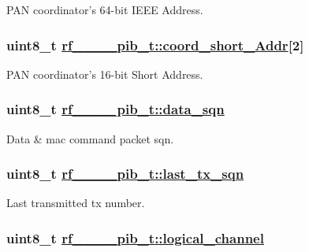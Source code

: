 PAN coordinator's 64-bit IEEE Address. \hypertarget{structrf__802__15__4__pib__t_0bf213a8ed84006ff69a764f07d09b85}{
\subsubsection[coord\_\-short\_\-Addr]{\setlength{\rightskip}{0pt plus 5cm}uint8\_\-t \hyperlink{structrf__802__15__4__pib__t_0bf213a8ed84006ff69a764f07d09b85}{rf\_\_\_\_\-pib\_\-t::coord\_\-short\_\-Addr}\mbox{[}2\mbox{]}}}
\label{structrf__802__15__4__pib__t_0bf213a8ed84006ff69a764f07d09b85}


PAN coordinator's 16-bit Short Address. \hypertarget{structrf__802__15__4__pib__t_48f4794258b60399b861fb91fe95dbb0}{
\subsubsection[data\_\-sqn]{\setlength{\rightskip}{0pt plus 5cm}uint8\_\-t \hyperlink{structrf__802__15__4__pib__t_48f4794258b60399b861fb91fe95dbb0}{rf\_\_\_\_\-pib\_\-t::data\_\-sqn}}}
\label{structrf__802__15__4__pib__t_48f4794258b60399b861fb91fe95dbb0}


Data \& mac command packet sqn. \hypertarget{structrf__802__15__4__pib__t_733aa4f7ba363cb83eb06e9c95d3fcc4}{
\subsubsection[last\_\-tx\_\-sqn]{\setlength{\rightskip}{0pt plus 5cm}uint8\_\-t \hyperlink{structrf__802__15__4__pib__t_733aa4f7ba363cb83eb06e9c95d3fcc4}{rf\_\_\_\_\-pib\_\-t::last\_\-tx\_\-sqn}}}
\label{structrf__802__15__4__pib__t_733aa4f7ba363cb83eb06e9c95d3fcc4}


Last transmitted tx number. \hypertarget{structrf__802__15__4__pib__t_dddfdd709fd10c0f6905935cf79e70cd}{
\subsubsection[logical\_\-channel]{\setlength{\rightskip}{0pt plus 5cm}uint8\_\-t \hyperlink{structrf__802__15__4__pib__t_dddfdd709fd10c0f6905935cf79e70cd}{rf\_\_\_\_\-pib\_\-t::logical\_\-channel}}}
\label{structrf__802__15__4__pib__t_dddfdd709fd10c0f6905935cf79e70cd}


